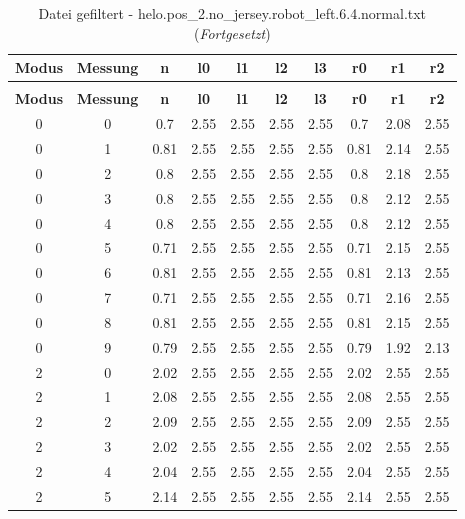 \begin{longtable}{|c|c||c||c|c|c|c||c|c|c|}
	\caption{Datei gefiltert - helo.pos\_2.no\_jersey.robot\_left.6.4.normal.txt} \label{tab:helo.pos-2.no-jersey.robot-left.6.4.normal.txt} \\ \hline
	\textbf{Modus} & \textbf{Messung} & \textbf{n} & \textbf{l0} & \textbf{l1} & \textbf{l2} & \textbf{l3} & \textbf{r0} & \textbf{r1} & \textbf{r2}\\ \hline
	\endfirsthead
	\caption[]{Datei gefiltert - helo.pos\_2.no\_jersey.robot\_left.6.4.normal.txt (\emph{Fortgesetzt})} \\ \hline
	\textbf{Modus} & \textbf{Messung} & \textbf{n} & \textbf{l0} & \textbf{l1} & \textbf{l2} & \textbf{l3} & \textbf{r0} & \textbf{r1} & \textbf{r2}\\ \hline
	\endhead
	0 & 0 & 0.7 & 2.55 & 2.55 & 2.55 & 2.55 & 0.7 & 2.08 & 2.55 \\ \hline
	0 & 1 & 0.81 & 2.55 & 2.55 & 2.55 & 2.55 & 0.81 & 2.14 & 2.55 \\ \hline
	0 & 2 & 0.8 & 2.55 & 2.55 & 2.55 & 2.55 & 0.8 & 2.18 & 2.55 \\ \hline
	0 & 3 & 0.8 & 2.55 & 2.55 & 2.55 & 2.55 & 0.8 & 2.12 & 2.55 \\ \hline
	0 & 4 & 0.8 & 2.55 & 2.55 & 2.55 & 2.55 & 0.8 & 2.12 & 2.55 \\ \hline
	0 & 5 & 0.71 & 2.55 & 2.55 & 2.55 & 2.55 & 0.71 & 2.15 & 2.55 \\ \hline
	0 & 6 & 0.81 & 2.55 & 2.55 & 2.55 & 2.55 & 0.81 & 2.13 & 2.55 \\ \hline
	0 & 7 & 0.71 & 2.55 & 2.55 & 2.55 & 2.55 & 0.71 & 2.16 & 2.55 \\ \hline
	0 & 8 & 0.81 & 2.55 & 2.55 & 2.55 & 2.55 & 0.81 & 2.15 & 2.55 \\ \hline
	0 & 9 & 0.79 & 2.55 & 2.55 & 2.55 & 2.55 & 0.79 & 1.92 & 2.13 \\ \hline
	2 & 0 & 2.02 & 2.55 & 2.55 & 2.55 & 2.55 & 2.02 & 2.55 & 2.55 \\ \hline
	2 & 1 & 2.08 & 2.55 & 2.55 & 2.55 & 2.55 & 2.08 & 2.55 & 2.55 \\ \hline
	2 & 2 & 2.09 & 2.55 & 2.55 & 2.55 & 2.55 & 2.09 & 2.55 & 2.55 \\ \hline
	2 & 3 & 2.02 & 2.55 & 2.55 & 2.55 & 2.55 & 2.02 & 2.55 & 2.55 \\ \hline
	2 & 4 & 2.04 & 2.55 & 2.55 & 2.55 & 2.55 & 2.04 & 2.55 & 2.55 \\ \hline
	2 & 5 & 2.14 & 2.55 & 2.55 & 2.55 & 2.55 & 2.14 & 2.55 & 2.55 \\ \hline

\end{longtable}
